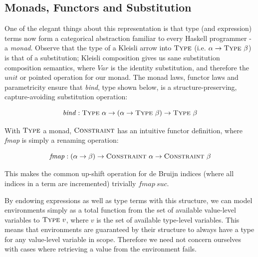 \documentclass[a4paper]{jfp}
\begin{document}
\subsection{Monads, Functors and Substitution}

One of the elegant things about this representation is that type (and expression) terms now form a categorical abstraction familiar to every Haskell programmer - a \emph{monad}. Observe that the type of a Kleisli arrow into $\textsc{Type}$ (i.e. $\alpha \rightarrow \textsc{Type}\ \beta$) is that of a substitution; Kleisli composition gives us sane substitution composition semantics, where $\mathit{Var}$ is the identity substitution, and therefore the $\mathit{unit}$ or pointed operation for our monad. The monad laws, functor laws and parametricity ensure that \emph{bind}, type shown below, is a structure-preserving, capture-avoiding substitution operation:

\nopagebreak

\begin{displaymath}
	\mathit{bind} : \textsc{Type}\ \alpha \rightarrow (\alpha \rightarrow \textsc{Type}\ \beta) \rightarrow \textsc{Type}\ \beta
\end{displaymath}

\medskip

With $\textsc{Type}$ a monad, $\textsc{Constraint}$ has an intuitive functor definition, where \emph{fmap} is simply a renaming operation:

\begin{displaymath}
	\mathit{fmap} : (\alpha \rightarrow \beta) \rightarrow \textsc{Constraint}\ \alpha \rightarrow \textsc{Constraint}\ \beta
\end{displaymath}

This makes the common up-shift operation for de Bruijn indices (where all indices in a term are incremented) trivially $\mathit{fmap}\ \mathit{suc}$.

\medskip

By endowing expressions as well as type terms with this structure, we can model environments simply as a total function from the set of available value-level variables to $\textsc{Type}\ v$, where $v$ is the set of available type-level variables. This means that environments are guaranteed by their structure to always have a type for any value-level variable in scope. Therefore we need not concern ourselves with cases where retrieving a value from the environment fails.

\medskip
\end{document}
